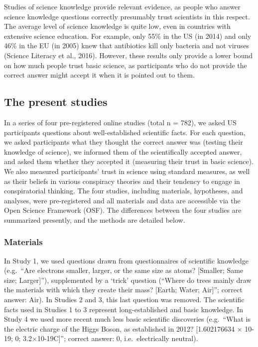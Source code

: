\documentclass[
  doc,floatsintext]{apa6}
\begin{document}
Studies of science knowledge provide relevant evidence, as people who answer science knowledge questions correctly presumably trust scientists in this respect. The average level of science knowledge is quite low, even in countries with extensive science education. For example, only 55\% in the US (in 2014) and only 46\% in the EU (in 2005) knew that antibiotics kill only bacteria and not viruses (Science Literacy et al., 2016). However, these results only provide a lower bound on how much people trust basic science, as participants who do not provide the correct answer might accept it when it is pointed out to them.

\subsection{The present studies}\label{the-present-studies}

In a series of four pre-registered online studies (total n = 782), we asked US participants questions about well-established scientific facts. For each question, we asked participants what they thought the correct answer was (testing their knowledge of science), we informed them of the scientifically accepted answer, and asked them whether they accepted it (measuring their trust in basic science). We also measured participants' trust in science using standard measures, as well as their beliefs in various conspiracy theories and their tendency to engage in conspiratorial thinking. The four studies, including materials, hypotheses, and analyses, were pre-registered and all materials and data are accessible via the Open Science Framework (OSF). The differences between the four studies are summarized presently, and the methods are detailed below.

\subsubsection{Materials}\label{materials}

In Study 1, we used questions drawn from questionnaires of scientific knowledge (e.g.~``Are electrons smaller, larger, or the same size as atoms? {[}Smaller; Same size; Larger{]}''), supplemented by a `trick' question (``Where do trees mainly draw the materials with which they create their mass? {[}Earth; Water; Air{]}''; correct answer: Air). In Studies 2 and 3, this last question was removed. The scientific facts used in Studies 1 to 3 represent long-established and basic knowledge. In Study 4 we used more recent much less basic scientific discoveries (e.g.~``What is the electric charge of the Higgs Boson, as established in 2012? {[}1.602176634 × 10-19; 0; 3.2×10-19C{]}''; correct answer: 0, i.e.~electrically neutral).
\end{document}
